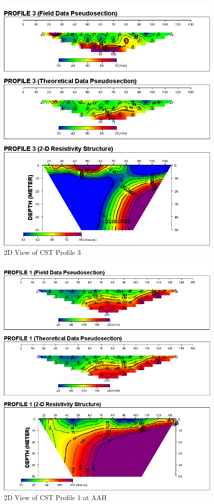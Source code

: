 \documentclass[12pt,a4paper]{report}
\begin{document}
\begin{figure}[H]
    \centering
    \includegraphics[width=1.0\textwidth]{PROFILE 3D.png}
    \caption{2D View of CST Profile 3}
    \label{fig:UI_CST_3_Curve}
\end{figure}

\begin{figure}[H]
    \centering
    \includegraphics[width=1.0\textwidth]{PROFILE 1D (1).png}
    \caption{2D View of CST Profile 1 at AAH}
    \label{fig:AAH_CST_1_Curve}
\end{figure}
\end{document}
